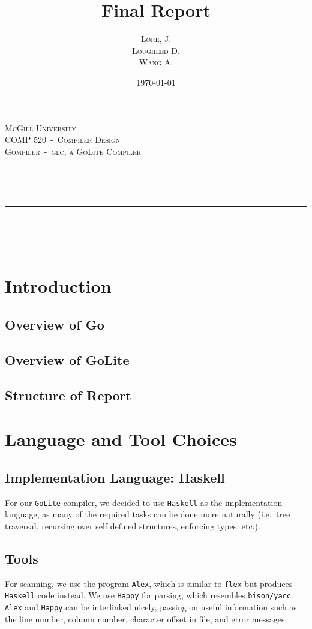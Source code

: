 \documentclass[11pt]{article}
\author{\textsc{Lore}, J.\\ \textsc{Lougheed} D.\\ \textsc{Wang} A.}
\date{\today}
\title{Final Report}
\newcommand{\HRule}{\rule{\linewidth}{0.5mm}}
\begin{document}
\begin{titlepage}
  \center%

  \textsc{\LARGE McGill University}\\[1.5cm]
  \textsc{\Large COMP 520~-~Compiler Design}\\[0.5cm]
  \textsc{\large Gompiler~-~glc, a GoLite Compiler}\\[0.5cm]

  \HRule~\\[0.4cm]
  { \huge \bfseries \thetitle}\\[0.4cm]
  \HRule~\\[1.5cm]

  \theauthor\\%
  [3cm]

  {\large \thedate}\\[2cm]

  \vfill

\end{titlepage}
\tableofcontents
\newpage
\section{Introduction}
\subsection{Overview of Go}
\subsection{Overview of GoLite}
\subsection{Structure of Report}
\section{Language and Tool Choices}
\subsection{Implementation Language: Haskell}
For our \texttt{GoLite} compiler, we decided to use \texttt{Haskell}
as the implementation language, as many of the required tasks can be
done more naturally (i.e.\ tree traversal, recursing over self defined
structures, enforcing types, etc.).
\subsection{Tools}
For scanning, we use the program \texttt{Alex}\cite{github:alex}, which is similar to
\texttt{flex} but produces \texttt{Haskell} code instead. We use
\texttt{Happy}\cite{github:happy} for parsing, which resembles
\texttt{bison/yacc}. \texttt{Alex} and \texttt{Happy} can be
interlinked nicely, passing on useful information such as the line number, column number, character
offset in file, and error messages.
\end{document}
